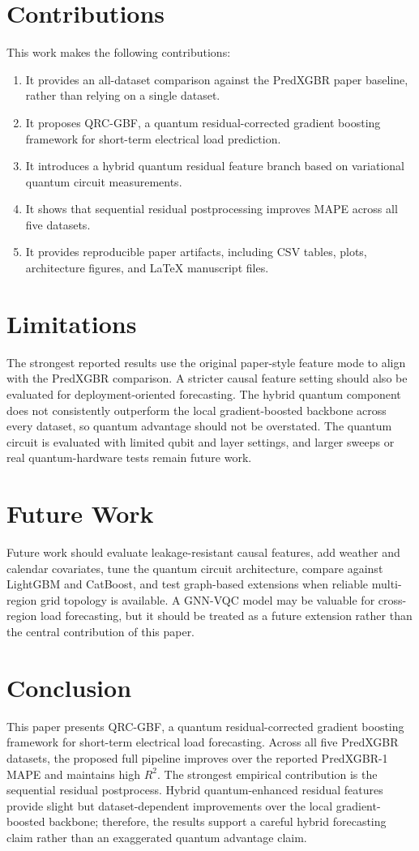 \documentclass[11pt]{article}
\begin{document}
\section{Contributions}
This work makes the following contributions:
\begin{enumerate}
    \item It provides an all-dataset comparison against the PredXGBR paper baseline, rather than relying on a single dataset.
    \item It proposes QRC-GBF, a quantum residual-corrected gradient boosting framework for short-term electrical load prediction.
    \item It introduces a hybrid quantum residual feature branch based on variational quantum circuit measurements.
    \item It shows that sequential residual postprocessing improves MAPE across all five datasets.
    \item It provides reproducible paper artifacts, including CSV tables, plots, architecture figures, and LaTeX manuscript files.
\end{enumerate}

\section{Limitations}
The strongest reported results use the original paper-style feature mode to align with the PredXGBR comparison. A stricter causal feature setting should also be evaluated for deployment-oriented forecasting. The hybrid quantum component does not consistently outperform the local gradient-boosted backbone across every dataset, so quantum advantage should not be overstated. The quantum circuit is evaluated with limited qubit and layer settings, and larger sweeps or real quantum-hardware tests remain future work.

\section{Future Work}
Future work should evaluate leakage-resistant causal features, add weather and calendar covariates, tune the quantum circuit architecture, compare against LightGBM and CatBoost, and test graph-based extensions when reliable multi-region grid topology is available. A GNN-VQC model may be valuable for cross-region load forecasting, but it should be treated as a future extension rather than the central contribution of this paper.

\section{Conclusion}
This paper presents QRC-GBF, a quantum residual-corrected gradient boosting framework for short-term electrical load forecasting. Across all five PredXGBR datasets, the proposed full pipeline improves over the reported PredXGBR-1 MAPE and maintains high $R^2$. The strongest empirical contribution is the sequential residual postprocess. Hybrid quantum-enhanced residual features provide slight but dataset-dependent improvements over the local gradient-boosted backbone; therefore, the results support a careful hybrid forecasting claim rather than an exaggerated quantum advantage claim.



\end{document}
